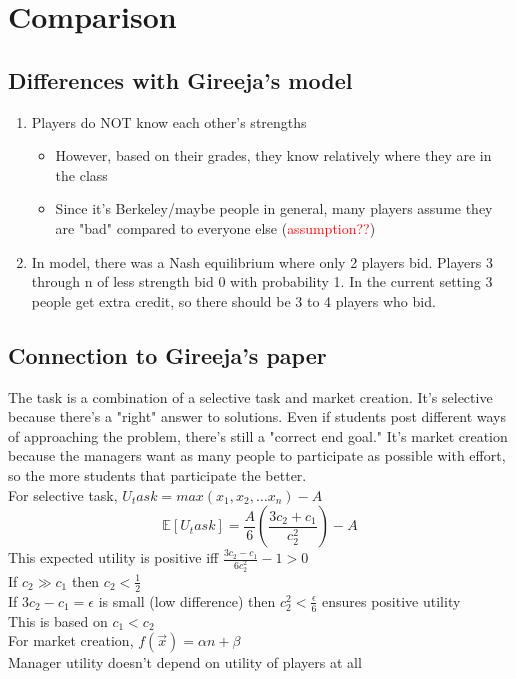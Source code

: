 \documentclass[leqno]{article}
\begin{document}
\section{Comparison}
\subsection{Differences with Gireeja's model}
\begin{enumerate}
\item Players do NOT know each other's strengths
\begin{itemize}
\item However, based on their grades, they know relatively where they are in the class
\item Since it's Berkeley/maybe people in general, many players assume they are "bad" compared to everyone else (\textcolor{red}{assumption??})
\end{itemize}
\item In model, there was a Nash equilibrium where only 2 players bid. Players 3 through n of less strength bid 0 with probability 1. In the current setting 3 people get extra credit, so there should be 3 to 4 players who bid.
\end{enumerate}

\subsection{Connection to Gireeja's paper}
The task is a combination of a selective task and market creation. It's selective because there's a "right" answer to solutions. Even if students post different ways of approaching the problem, there's still a "correct end goal." It's market creation because the managers want as many people to participate as possible with effort, so the more students that participate the better.\\

For selective task, $U_task = max(x_1,x_2,\dots x_n) - A$
\[ \mathbb{E}[U_task] = \frac{A}{6}\left(\frac{3c_2+c_1}{c_2^2}\right) - A \]
This expected utility is positive iff $\frac{3c_2-c_1}{6c_2^2} - 1 > 0$\\
If $c_2 \gg c_1$ then $c_2 < \frac{1}{2}$\\
If $3c_2-c_1 = \epsilon$ is small (low difference) then $c_2^2 < \frac{\epsilon}{6}$ ensures positive utility\\
This is based on $c_1 < c_2$\\

For market creation, $f(\overrightarrow{x}) = \alpha n + \beta$\\
Manager utility doesn't depend on utility of players at all
\end{document}
